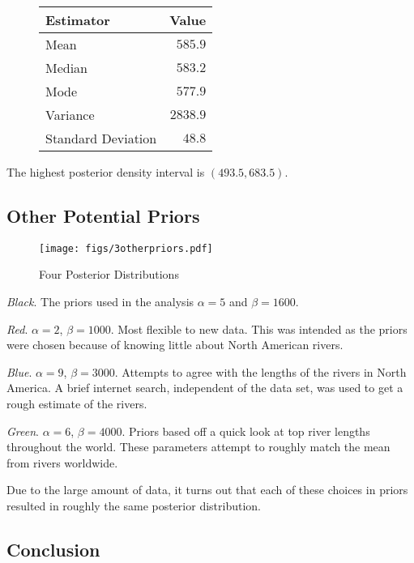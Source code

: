 \documentclass[12pt]{article}
\begin{document}
\begin{figure}[H]
\begin{center}
\begin{tabular}{l|r}
Estimator & \multicolumn{1}{l}{Value} \\ \hline \hline
Mean               & $585.9$ \\
Median             & $583.2$ \\
Mode               & $577.9$ \\
Variance           & $2838.9$ \\
Standard Deviation & $48.8$ \\
\end{tabular}
\end{center}
\end{figure}

\noindent The highest posterior density interval is $(493.5, 683.5)$.

\subsection{Other Potential Priors}

\begin{figure}[H]
\begin{center}
\texttt{[image: figs/3otherpriors.pdf]}
\caption{Four Posterior Distributions}
\end{center}
\end{figure}

\noindent \textit{Black}.  The priors used in the analysis $\alpha=5$ and $\beta=1600$.

\noindent \textit{Red}. $\alpha=2$, $\beta=1000$.  Most flexible to new data.  This was intended as the priors were chosen because of knowing little about North American rivers.

\noindent \textit{Blue}. $\alpha=9$, $\beta=3000$.  Attempts to agree with the lengths of the rivers in North America.  A brief internet search, independent of the data set, was used to get a rough estimate of the rivers.

\noindent \textit{Green}. $\alpha=6$, $\beta=4000$.  Priors based off a quick look at top river lengths throughout the world.  These parameters attempt to roughly match the mean from rivers worldwide.
\bigskip

\noindent Due to the large amount of data, it turns out that each of these choices in priors resulted in roughly the same posterior distribution.

\subsection{Conclusion}
\end{document}
